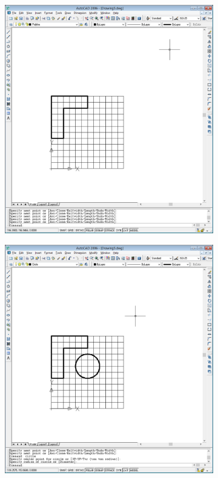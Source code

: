\documentclass[
	a4paper,
	oneside,
	BCOR = 10mm,
	DIV = 12,
	12pt,
	headings = normal,
]{scrartcl}
\newlength{\gridunitwidth}
\begin{document}
			\begin{figure}[!htbp]
				\begin{subfigure}[b]{6 \gridunitwidth - (1em / 2)}
					\includegraphics[width = \columnwidth]{./assets/p04.png}
					\caption{}
					\label{subfig:02-figures-polygon}
				\end{subfigure}%
				\hspace{1em}%
				\begin{subfigure}[b]{6 \gridunitwidth - (1em / 2)}
					\centering
					\includegraphics[width = \columnwidth]{./assets/p05.png}

\end{subfigure}
\end{figure}
\end{document}
